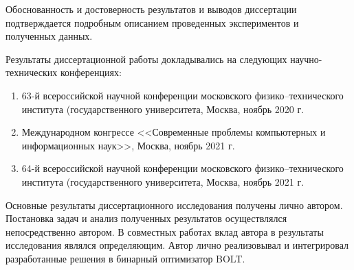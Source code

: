 {\reliability}
Обоснованность и достоверность результатов и выводов диссертации подтверждается подробным описанием проведенных экспериментов и полученных данных.

{\probation}
Результаты диссертационной работы докладывались на следующих научно-технических конференциях:
\begin{enumerate}[beginpenalty=10000] %
  \item 63-й всероссийской научной конференции московского физико–технического института (государственного университета, Москва, ноябрь 2020 г.
  \item Международном конгрессе <<Современные проблемы компьютерных и информационных наук>>, Москва, ноябрь 2021 г.
  \item 64-й всероссийской научной конференции московского физико–технического института (государственного университета, Москва, ноябрь 2021 г.
\end{enumerate}

{\contribution} Основные результаты диссертационного исследования получены лично автором. Постановка задач и анализ полученных результатов осуществлялся непосредственно автором. В совместных работах вклад автора в результаты исследования являлся определяющим. Автор лично реализовывал и интегрировал разработанные решения в бинарный оптимизатор BOLT.

